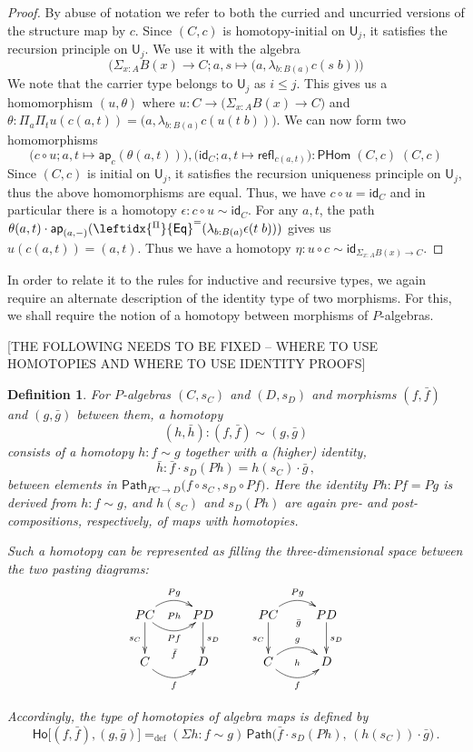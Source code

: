 \documentclass[10pt,a4paper,oneside,reqno]{amsart}
\numberwithin{equation}{section}
\theoremstyle{mythm}
\theoremstyle{mydef}
\newtheorem{definition}[theorem]{Definition}
\theoremstyle{myrmk}
\newcommand{\defeq}{=_{\mathrm{def}}}
\newcommand{\idfun}[1]{\mathsf{id}_{#1}}
\newcommand{\comp}{\circ}
\newcommand{\ct}{\cdot}
\newcommand{\funext}{\leftidx{^\Pi}{\mathsf{Eq}}^{=}}
\newcommand{\prd}[1]{\Pi_{#1}}
\newcommand{\sm}[1]{\Sigma_{#1}}
\newcommand{\lam}[1]{\lambda_{#1}}
\newcommand{\app}{\mathsf{ap}}
\newcommand{\Id}{\mathsf{Path}}
\newcommand{\id}[1]{\Id_{#1}}
\newcommand{\refl}{\mathsf{refl}}
\newcommand{\UU}{\mathsf{U}}
\newcommand{\Ho}{\mathsf{Ho}}
\newcommand{\WHom}{\mathsf{PHom}}
\begin{document}
\begin{proof}
By abuse of notation we refer to both the curried and uncurried versions of the structure map by $c$. Since $(C,c)$ is homotopy-initial on $\UU_j$, it satisfies the recursion principle on $\UU_j$. We use it with the algebra \[\Big(\sm{x:A} B(x) \to C; a,s \mapsto \big(a,\lam{b:B(a)} c(s\;b)\big)\Big)\]
We note that the carrier type belongs to $\UU_j$ as $i \leq j$. This gives us a homomorphism $(u,\theta)$ where $u : C \to \big(\sm{x:A} B(x) \to C\big)$ and $\theta : \prd{a}\prd{t} u(c(a,t)) = \big(a,\lam{b:B(a)} c(u(t\;b))\big)$.  We can now form two homomorphisms
\[\big(c \comp u; a,t \mapsto \app_c(\theta(a,t))\big), \big(\idfun{C}; a,t \mapsto \refl_{c(a,t)}\big) : \WHom \; (C,c) \; (C,c)\]
Since $(C,c)$ is initial on $\UU_j$, it satisfies the recursion uniqueness principle on $\UU_j$, thus the above homomorphisms are equal. Thus, we have $c \comp u = \idfun{C}$ and in particular there is a homotopy $\epsilon : c \comp u \sim \idfun{C}$. For any $a,t$, the path $\theta(a,t) \ct \app_{(a,-)}(\funext(\lam{b:B(a)} \epsilon(t\;b)))$ gives us $u(c(a,t)) = (a,t)$. Thus we have a homotopy $\eta : u \comp c \sim \idfun{\sm{x:A} B(x) \to C}$.
\end{proof}



In order to relate it to the rules for inductive and recursive types, we again require an alternate description of the identity type of two morphisms. For this, we shall require the notion of a homotopy between morphisms of $P$-algebras. 

[THE FOLLOWING NEEDS TO BE FIXED -- WHERE TO USE HOMOTOPIES AND WHERE TO USE IDENTITY PROOFS]
\begin{definition}
For $P$-algebras $(C,s_C)$ and $(D,s_D)$ and morphisms $(f, \bar{f})$ and $(g, \bar{g})$ between them, a \emph{homotopy}  $$(h, \bar{h}) : (f, \bar{f}) \sim (g, \bar{g})$$
consists of a homotopy $h : f \sim g$ together with a (higher) identity, 
\[
\bar{h} : \bar{f} \cdot s_D(Ph) = h(s_C)\cdot \bar{g}\, ,
\]
between elements in $\id{PC \rightarrow D}\big( f \circ s_C \, ,  s_{D} \circ Pf \big)$.  Here the identity $Ph : Pf = Pg$ is derived from $h : f \sim g$, and $h(s_C)$ and $s_D(Ph)$ are again pre- and post-compositions, respectively, of maps with homotopies.

Such a homotopy can be represented as filling the three-dimensional space between the two pasting diagrams:
\[
\xymatrix{
PC \ar@/^1pc/[r]^{Pg}   \ar[d]_{s_C}   \ar@/_1pc/[r]_{Pf} \ar@{}[r]|{Ph}
& PD \ar[d]^{s_D}  \\
C  \ar@/_1pc/[r]_f  \ar@{}[r]^{\bar{f}} & D }
\qquad
\xymatrix{
PC \ar@/^1pc/[r]^{Pg}   \ar[d]_{s_C} \ar@{}[r]_(.52){\bar{g}}  & PD \ar[d]^{s_D}  \\
C \ar@/^1pc/[r]^g  \ar@/_1pc/[r]_f  \ar@{}[r]|{h} & D }
\]

Accordingly, the type of homotopies of algebra maps is defined by
\[
\Ho
\big[ (f,\bar{f}), (g, \bar{g})  \big]
 \defeq  
(\Sigma h:  f \sim g) \, \Id\big( \bar{f} \cdot s_D(Ph),\, (h(s_C))\cdot \bar{g} \big) \, .
\]
\end{definition}
\end{document}
